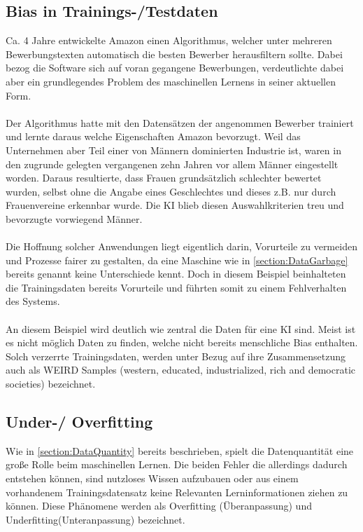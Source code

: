 \documentclass[12pt,oneside,a4paper,parskip]{scrbook}
\begin{document}
\subsection{Bias in Trainings-/Testdaten}
\label{section:biasInTest}
Ca. 4 Jahre entwickelte Amazon einen Algorithmus, welcher unter mehreren Bewerbungstexten automatisch die besten Bewerber herausfiltern sollte. Dabei bezog die Software sich auf voran gegangene Bewerbungen, verdeutlichte dabei aber ein grundlegendes Problem des maschinellen Lernens in seiner aktuellen Form.\\\\
Der Algorithmus hatte mit den Datensätzen der angenommen Bewerber trainiert und lernte daraus welche Eigenschaften Amazon bevorzugt. Weil das Unternehmen aber Teil einer von Männern dominierten Industrie ist, waren in den zugrunde gelegten vergangenen zehn Jahren vor allem Männer eingestellt worden. Daraus resultierte, dass Frauen grundsätzlich schlechter bewertet wurden, selbst ohne die Angabe eines Geschlechtes und dieses z.B. nur durch Frauenvereine erkennbar wurde. Die KI blieb diesen Auswahlkriterien treu und bevorzugte vorwiegend Männer.\cite{amazon}
\\\\
Die Hoffnung solcher Anwendungen liegt eigentlich darin, Vorurteile zu vermeiden und Prozesse fairer zu gestalten, da eine Maschine wie in \ref{section:DataGarbage} bereits genannt keine Unterschiede kennt. Doch in diesem Beispiel beinhalteten die Trainingsdaten bereits Vorurteile und führten somit zu einem Fehlverhalten des Systems.
\\\\
An diesem Beispiel wird deutlich wie zentral die Daten für eine KI sind.
Meist ist es nicht möglich Daten zu finden, welche nicht bereits menschliche Bias enthalten. Solch verzerrte Trainingsdaten, werden unter Bezug auf ihre Zusammensetzung auch als WEIRD Samples (western, educated, industrialized, rich and democratic societies) bezeichnet\cite{BiasInKi}.


\subsection{Under-/ Overfitting}
\label{section:OverUnderfitting}

Wie in \ref{section:DataQuantity} bereits beschrieben, spielt die Datenquantität eine große Rolle beim maschinellen Lernen. Die beiden Fehler die allerdings dadurch entstehen können, sind nutzloses Wissen aufzubauen oder aus einem vorhandenem Trainingsdatensatz keine Relevanten Lerninformationen ziehen zu können. Diese Phänomene werden als Overfitting (Überanpassung) und Underfitting(Unteranpassung) bezeichnet.
\end{document}
